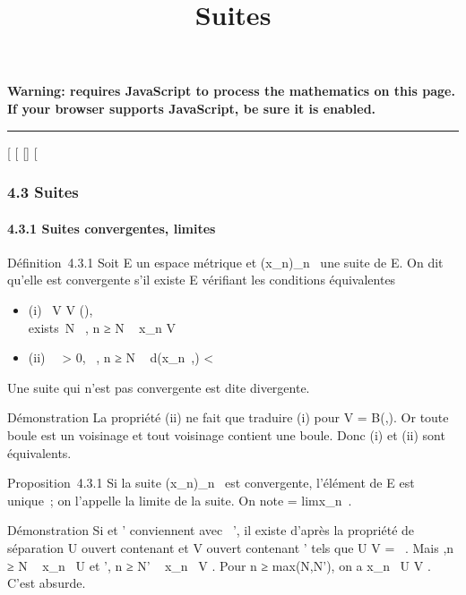 \documentclass[]{article}
\title{Suites}
\author{}
\date{}
\begin{document}
\maketitle

\textbf{Warning: 
requires JavaScript to process the mathematics on this page.\\ If your
browser supports JavaScript, be sure it is enabled.}

\begin{center}\rule{3in}{0.4pt}\end{center}

{[}
{[}
{[}{]}
{[}

\subsubsection{4.3 Suites}

\paragraph{4.3.1 Suites convergentes, limites}

Définition~4.3.1 Soit E un espace métrique et
(x_n)_n\in{}~ une suite de E. On dit qu'elle est
convergente s'il existe \ell \in E vérifiant les conditions équivalentes

\begin{itemize}
\itemsep1pt\parskip0pt
\item
  (i) \forall~V \in V (\ell), \\exists~N
  \in {}~, n ≥ N \rigtharrow~ x_n \in V
\item
  (ii) \forall~~\epsilon \textgreater{} 0,
  \existsN \in {}~, n ≥ N \rigtharrow~ d(x_n~,\ell)
  \textless{} \epsilon
\end{itemize}

Une suite qui n'est pas convergente est dite divergente.

Démonstration La propriété (ii) ne fait que traduire (i) pour V =
B(\ell,\epsilon). Or toute boule est un voisinage et tout voisinage contient une
boule. Donc (i) et (ii) sont équivalents.

Proposition~4.3.1 Si la suite (x_n)_n\in{}~ est
convergente, l'élément \ell de E est unique~; on l'appelle la limite de la
suite. On note \ell = limx_n~.

Démonstration Si \ell et \ell' conviennent avec \ell\neq~\ell', il existe d'après la
propriété de séparation U ouvert contenant \ell et V ouvert contenant \ell'
tels que U \bigcap V = \varnothing~. Mais
\existsN,\quad n ≥ N \rigtharrow~ x_n~ \in
U et \existsN', n ≥ N' \rigtharrow~ x_n~ \in V . Pour n
≥ max(N,N'), on a x_n~ \in U \bigcap V . C'est
absurde.
\end{document}
